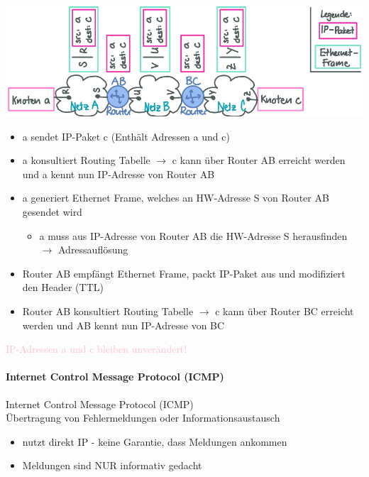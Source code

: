 \begin{example}
    \includegraphics[width=1\linewidth]{images/encapsulation_bsp.png}\\
    \begin{itemize}
        \item a sendet IP-Paket c (Enthält Adressen a und c)
        \item a konsultiert Routing Tabelle $\rightarrow$ c kann über Router AB erreicht werden und a kennt nun IP-Adresse von Router AB
        \item a generiert Ethernet Frame, welches an HW-Adresse S von Router AB gesendet wird
        \begin{itemize}
            \item a muss aus IP-Adresse von Router AB die HW-Adresse S herausfinden $\rightarrow$ Adressauflösung
        \end{itemize}
        \item Router AB empfängt Ethernet Frame, packt IP-Paket aus und modifiziert den Header (TTL)
        \item Router AB konsultiert Routing Tabelle $\rightarrow$ c kann über Router BC erreicht werden und AB kennt nun IP-Adresse von BC
    \end{itemize}
    \textcolor{pink}{IP-Adressen a und c bleiben unverändert!}
\end{example}



\paragraph{Internet Control Message Protocol (ICMP)}

\begin{concept}{Internet Control Message Protocol (ICMP)}\\
    Übertragung von Fehlermeldungen oder Informationsaustausch
    \begin{itemize}
        \item nutzt direkt IP - keine Garantie, dass Meldungen ankommen
        \item Meldungen sind NUR informativ gedacht
    \end{itemize}
\end{concept}


